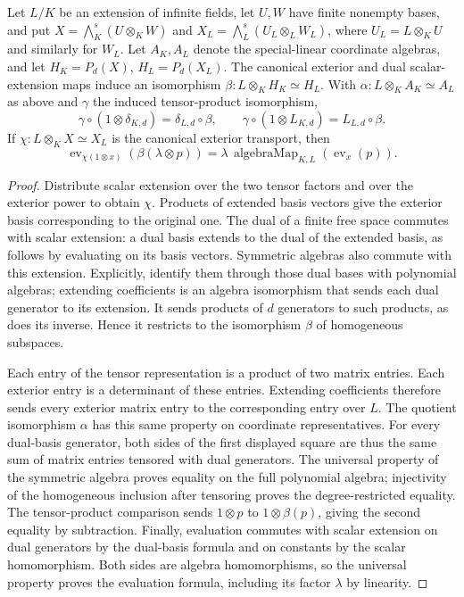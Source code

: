 \begin{lemma}
\label{lem:balanced-coaction-base-change}
\notready
Let $L/K$ be an extension of infinite fields, let $U,W$ have finite
nonempty bases, and put $X=\bigwedge_K^s(U\otimes_KW)$ and
$X_L=\bigwedge_L^s(U_L\otimes_LW_L)$, where $U_L=L\otimes_KU$
and similarly for $W_L$. Let $A_K,A_L$ denote the special-linear
coordinate algebras, and let $H_K=P_d(X)$, $H_L=P_d(X_L)$.
The canonical exterior and dual scalar-extension maps induce an isomorphism
$\beta:L\otimes_KH_K\simeq H_L$. With $\alpha:L\otimes_KA_K\simeq A_L$
as above and $\gamma$ the induced tensor-product isomorphism,
\[
 \gamma\circ(1\otimes\delta_{K,d})=\delta_{L,d}\circ\beta,
 \qquad
 \gamma\circ(1\otimes L_{K,d})=L_{L,d}\circ\beta.
\]
If $\chi:L\otimes_KX\simeq X_L$ is the canonical exterior transport, then
\[
 \operatorname{ev}_{\chi(1\otimes x)}(\beta(\lambda\otimes p))
   =\lambda\,\operatorname{algebraMap}_{K,L}(\operatorname{ev}_x(p)).
\]
\end{lemma}
\begin{proof}
Distribute scalar extension over the two tensor factors and over the
exterior power to obtain $\chi$. Products of extended basis vectors
give the exterior basis corresponding to the original one. The dual
of a finite free space commutes with scalar extension: a dual basis
extends to the dual of the extended basis, as follows by evaluating
on its basis vectors. Symmetric algebras also commute with this
extension. Explicitly, identify them through those dual bases with
polynomial algebras; extending coefficients is an algebra isomorphism
that sends each dual generator to its extension. It sends products
of $d$ generators to such products, as does its inverse. Hence it
restricts to the isomorphism $\beta$ of homogeneous subspaces.

Each entry of the tensor representation is a product of two matrix
entries. Each exterior entry is a determinant of these entries.
Extending coefficients therefore sends every exterior matrix entry
to the corresponding entry over $L$. The quotient isomorphism $\alpha$
has this same property on coordinate representatives. For every
dual-basis generator, both sides of the first displayed square are
thus the same sum of matrix entries tensored with dual generators.
The universal property of the symmetric algebra proves equality on
the full polynomial algebra; injectivity of the homogeneous inclusion
after tensoring proves the degree-restricted equality.
The tensor-product comparison sends $1\otimes p$ to
$1\otimes\beta(p)$, giving the second equality by subtraction.
Finally, evaluation commutes with scalar extension on dual generators
by the dual-basis formula and on constants by the scalar homomorphism.
Both sides are algebra homomorphisms, so the universal property proves
the evaluation formula, including its factor $\lambda$ by linearity.
\end{proof}

